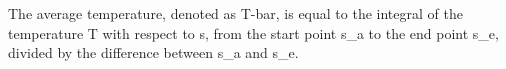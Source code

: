 The average temperature, denoted as T-bar, is equal to the integral of the temperature T with respect to s, from the start point s_a to the end point s_e, divided by the difference between s_a and s_e.